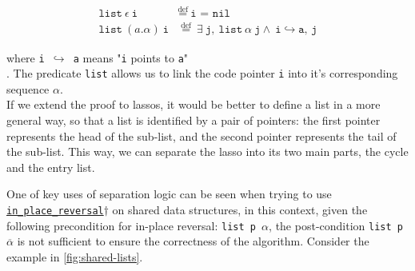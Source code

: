 \documentclass[11pt,a4paper]{article}
\begin{document}
\begin{align*}
\texttt{list}\ \epsilon\ \texttt{i} &\overset{\text{def}}{=}\ \texttt{i = nil} \\
\texttt{list}\ (a.\alpha)\ \texttt{i} &\overset{\text{def}}{=}\ \exists\ \texttt{j},\ \texttt{list}\ \alpha\ \texttt{j} \land\ \texttt{i} \hookrightarrow \texttt{a, j}
\end{align*}


where \texttt{i $\hookrightarrow$ a} means "\texttt{i} points to \texttt{a}"\\.
The predicate \texttt{list} allows us to link the code pointer \texttt{i} into it's corresponding sequence $\alpha$.\\
If we extend the proof to lassos, it would be better to define a list in a more general way, so that a list is identified by a pair of pointers: the first pointer represents the head of the sub-list, and the second pointer represents the tail of the sub-list. This way, we can separate the lasso into its two main parts, the cycle and the entry list.

One of key uses of separation logic can be seen when trying to use \hyperlink{reversal}{\texttt{in\_place\_reversal}$\dagger$} on shared data structures, in this context, given the following precondition for in-place reversal: \texttt{list p $\alpha$}, the post-condition \texttt{list p }$\overline{\alpha}$ is not sufficient to ensure the correctness of the algorithm. Consider the example in \autoref{fig:shared-lists}.
\end{document}
